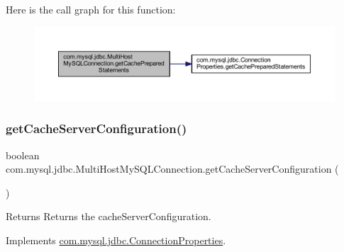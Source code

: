 Here is the call graph for this function\+:
\nopagebreak
\begin{figure}[H]
\begin{center}
\leavevmode
\includegraphics[width=350pt]{classcom_1_1mysql_1_1jdbc_1_1_multi_host_my_s_q_l_connection_a2f3e7980f5e4eaaa44c0235a6124ec81_cgraph}
\end{center}
\end{figure}
\mbox{\label{classcom_1_1mysql_1_1jdbc_1_1_multi_host_my_s_q_l_connection_aef3695ab6a8b5b8c534fc4020f6d12a4}} 
\subsubsection{\texorpdfstring{get\+Cache\+Server\+Configuration()}{getCacheServerConfiguration()}}
{\footnotesize\ttfamily boolean com.\+mysql.\+jdbc.\+Multi\+Host\+My\+S\+Q\+L\+Connection.\+get\+Cache\+Server\+Configuration (\begin{DoxyParamCaption}{ }\end{DoxyParamCaption})}

\begin{DoxyReturn}{Returns}
Returns the cache\+Server\+Configuration. 
\end{DoxyReturn}


Implements \mbox{\hyperlink{interfacecom_1_1mysql_1_1jdbc_1_1_connection_properties_a8827c77268d7c5b63d6f225cb955f70c}{com.\+mysql.\+jdbc.\+Connection\+Properties}}.

